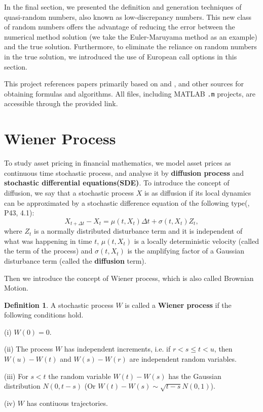 \documentclass[12pt,a4paper]{article}
\theoremstyle{definition}
\newtheorem{defn}{Definition}
\begin{document}
In the final section, we presented the definition and generation techniques of quasi-random numbers, also known as low-discrepancy numbers. This new class of random numbers offers the advantage of reducing the error between the numerical method solution (we take the Euler-Maruyama method as an example) and the true solution. Furthermore, to eliminate the reliance on random numbers in the true solution, we introduced the use of European call options in this section.

This project references papers primarily based on \cite{higham._2001} and \cite{sauer}, and other sources for obtaining formulas and algorithms. All files, including MATLAB \verb|.m| projects, are accessible through the provided link.
\section{Wiener Process}

To study asset pricing in financial mathematics, we model asset prices as continuous time stochastic process, and analyse it by \textbf{diffusion process} and \textbf{stochastic differential equations(SDE)}. To introduce the concept of diffusion, we say that a stochastic process $X$ is as diffusion if its local dynamics can be approximated by a stochastic difference equation of the following type(\cite{bjork}, P43, 4.1):\begin{equation}
    \label{eq-diffusion}X_{t+\Delta t}-X_t=\mu(t,X_t)\Delta t+\sigma(t,X_t)Z_t,
\end{equation}
where $Z_t$ is a normally distributed disturbance term and it is independent of what was happening in time $t$, $\mu(t,X_t)$ is a locally deterministic velocity (called the  term of the process) and $\sigma(t,X_t)$ is the amplifying factor of a Gaussian disturbance term (called the \textbf{diffusion} term).

Then we introduce the concept of Wiener process, which is also called Brownian Motion.

\begin{defn}\label{defn1}
    A stochastic process $W$ is called a \textbf{Wiener process} if the following conditions hold.

    (i) $W(0)=0.$

    (ii) The process $W$ has independent increments, i.e. if $r<s\le t<u$, then $W(u)-W(t)$ and $W(s)-W(r)$ are independent random variables. 

    (iii) For $s<t$ the random variable $W(t)-W(s)$ has the Gaussian distribution $N(0,t-s)$ (Or $W(t)-W(s)\sim\sqrt{t-s}N(0,1)$\cite{higham._2001}).

    (iv) $W$ has contiuous trajectories.
\end{defn}
\end{document}
